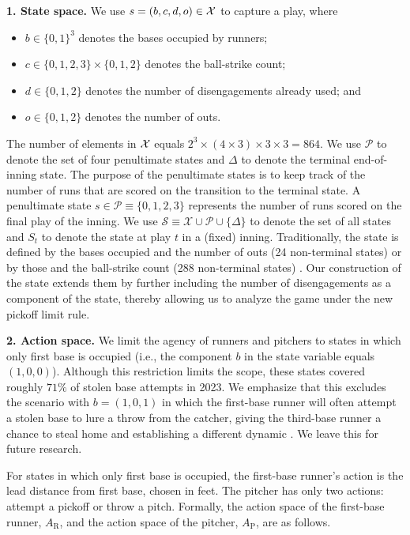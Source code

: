 \documentclass[opre,dblanonrev]{informs4}
\begin{document}
    {\bf 1. State space.} We use $s=(b,c,d,o) \in {\cal X}$ to capture a play, where     
    \begin{itemize}
      \item $b \in \{0, 1\}^3$ denotes the bases occupied by runners;
      \item $c \in \{0, 1, 2, 3\} \times \{0, 1, 2\}$ denotes the ball-strike count;
      \item $d \in \{0, 1, 2\}$ denotes the number of disengagements already used; and
      \item $o \in \{0, 1, 2\}$ denotes the number of outs.
    \end{itemize}
    The number of elements in ${\cal X}$ equals $2^3 \times (4 \times 3) \times 3 \times 3 = 864$. We use $\mathcal P$ to denote the set of four penultimate states and $\Delta$ to denote the terminal end-of-inning state. The purpose of the penultimate states is to keep track of the number of runs that are scored on the transition to the terminal state. A penultimate state $s \in \mathcal{P} \equiv \{0, 1, 2, 3\}$ represents the number of runs scored on the final play of the inning. We use $\mathcal{S} \equiv \mathcal{X} \cup \mathcal{P} \cup \{\Delta\}$ to denote the set of all states and $S_t$ to denote the state at play $t$ in a (fixed) inning. Traditionally, the state is defined by the bases occupied and the number of outs (24 non-terminal states) or by those and the ball-strike count (288 non-terminal states) \citep{bukiet_markov_1997}. Our construction of the state extends them by further including the number of disengagements as a component of the state, thereby allowing us to analyze the game under the new pickoff limit rule.

    {\bf 2. Action space.} We limit the agency of runners and pitchers to states in which only first base is occupied 
    (i.e., the component $b$ in the state variable equals $(1,0,0)$). Although this restriction limits the scope, these states covered roughly $71\%$ of stolen base attempts in 2023. We emphasize that this  excludes the scenario with $b = (1, 0, 1)$ in which the first-base runner will often attempt a stolen base to lure a throw from the catcher, giving the third-base runner a chance to steal home and establishing a different dynamic \citep{miller_first-and-third_2024}. We leave this for future research.
    
    For states in which only first base is occupied, the first-base runner's action is the lead distance from first base, chosen in feet. The pitcher has only two actions: attempt a pickoff or throw a pitch. Formally, the action space of the first-base runner, $A_{\text{R}}$, and the action space of the pitcher, $A_{\text{P}}$, are as follows.
    
\end{document}
